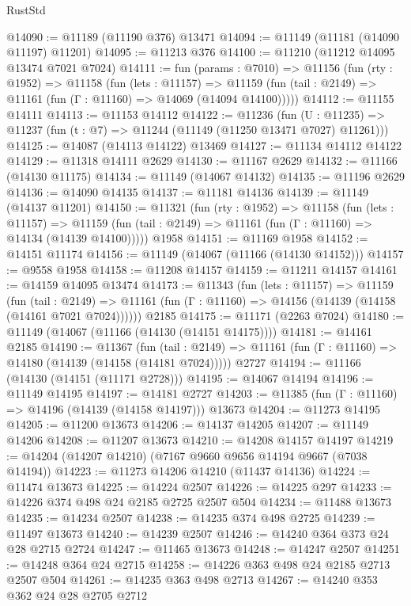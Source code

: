 \begin{lexlean}{RustStd}
\begin{coremodule}
@14090 := @11189 (@11190 @376) @13471
@14094 := @11149 (@11181 (@14090 @11197) @11201)
@14095 := @11213 @376
@14100 := @11210 (@11212 @14095 @13474 @7021 @7024)
@14111 := fun (params : @7010) =>
  @11156
    (fun (rty : @1952) =>
    @11158
      (fun (lets : @11157) =>
      @11159 (fun (tail : @2149) => @11161 (fun (Γ : @11160) => @14069 (@14094 @14100)))))
@14112 := @11155 @14111
@14113 := @11153 @14112
@14122 := @11236
    (fun (U : @11235) => @11237 (fun (t : @7) => @11244 (@11149 (@11250 @13471 @7027) @11261)))
@14125 := @14087 (@14113 @14122) @13469
@14127 := @11134 @14112 @14122
@14129 := @11318 @14111 @2629
@14130 := @11167 @2629
@14132 := @11166 (@14130 @11175)
@14134 := @11149 (@14067 @14132)
@14135 := @11196 @2629
@14136 := @14090 @14135
@14137 := @11181 @14136
@14139 := @11149 (@14137 @11201)
@14150 := @11321
    (fun (rty : @1952) =>
    @11158
      (fun (lets : @11157) =>
      @11159 (fun (tail : @2149) => @11161 (fun (Γ : @11160) => @14134 (@14139 @14100)))))
    @1958
@14151 := @11169 @1958
@14152 := @14151 @11174
@14156 := @11149 (@14067 (@11166 (@14130 @14152)))
@14157 := @9558 @1958
@14158 := @11208 @14157
@14159 := @11211 @14157
@14161 := @14159 @14095 @13474
@14173 := @11343
    (fun (lets : @11157) =>
    @11159
      (fun (tail : @2149) =>
      @11161 (fun (Γ : @11160) => @14156 (@14139 (@14158 (@14161 @7021 @7024))))))
    @2185
@14175 := @11171 (@2263 @7024)
@14180 := @11149 (@14067 (@11166 (@14130 (@14151 @14175))))
@14181 := @14161 @2185
@14190 := @11367
    (fun (tail : @2149) => @11161 (fun (Γ : @11160) => @14180 (@14139 (@14158 (@14181 @7024)))))
    @2727
@14194 := @11166 (@14130 (@14151 (@11171 @2728)))
@14195 := @14067 @14194
@14196 := @11149 @14195
@14197 := @14181 @2727
@14203 := @11385 (fun (Γ : @11160) => @14196 (@14139 (@14158 @14197))) @13673
@14204 := @11273 @14195
@14205 := @11200 @13673
@14206 := @14137 @14205
@14207 := @11149 @14206
@14208 := @11207 @13673
@14210 := @14208 @14157 @14197
@14219 := @14204 (@14207 @14210) (@7167 @9660 @9656 @14194 @9667 (@7038 @14194))
@14223 := @11273 @14206 @14210 (@11437 @14136)
@14224 := @11474 @13673
@14225 := @14224 @2507
@14226 := @14225 @297
@14233 := @14226 @374 @498 @24 @2185 @2725 @2507 @504
@14234 := @11488 @13673
@14235 := @14234 @2507
@14238 := @14235 @374 @498 @2725
@14239 := @11497 @13673
@14240 := @14239 @2507
@14246 := @14240 @364 @373 @24 @28 @2715 @2724
@14247 := @11465 @13673
@14248 := @14247 @2507
@14251 := @14248 @364 @24 @2715
@14258 := @14226 @363 @498 @24 @2185 @2713 @2507 @504
@14261 := @14235 @363 @498 @2713
@14267 := @14240 @353 @362 @24 @28 @2705 @2712

\end{coremodule}
\end{lexlean}

